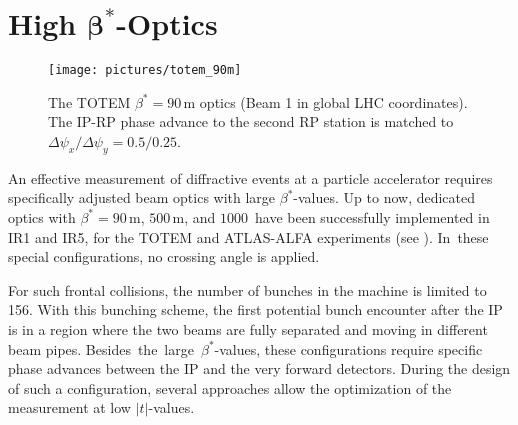 \section[High $\beta^*$-Optics]{High $\boldsymbol{\beta^*}$-Optics}
\begin{figure}[b]
  \centering
  \texttt{[image: pictures/totem\_90m]}
  \caption{The TOTEM $\beta^*=90\,$m optics (Beam 1 in global LHC coordinates). The IP-RP phase advance to the second RP station is matched to $\Delta \psi_x / \Delta \psi_y = 0.5/0.25$.} \label{totem_90m} 
\end{figure}
An effective measurement of diffractive events at a particle accelerator requires specifically adjusted beam optics with large $\beta^*$-values. Up to now, dedicated optics with $\beta^*=90\,$m, $500\,$m, and $1000\,$ have been successfully implemented in IR1 and IR5, for the TOTEM and ATLAS-ALFA experiments (see ). \mbox{In these} special configurations, no crossing angle is applied. 

For such frontal collisions, the number of bunches in the machine is limited to 156. With this bunching scheme, the first potential bunch encounter after the IP is in a region where the two beams are fully separated and moving in different beam pipes. \mbox{Besides the large $\beta^*$-values}, these configurations require specific phase advances between the IP and the very forward detectors. During the design of such a configuration, several approaches allow the optimization of the measurement at low $|t|$-values. 
%
%
